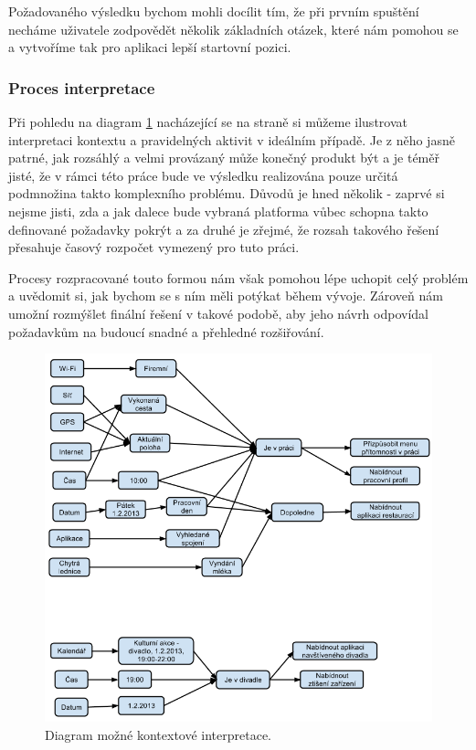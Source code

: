\documentclass[thesis=M,czech]{FITthesis}[2012/06/26]
\begin{document}
Požadovaného výsledku bychom mohli docílit tím, že při prvním spuštění necháme uživatele zodpovědět několik základních otázek, které nám pomohou se  a vytvoříme tak pro aplikaci lepší startovní pozici.

\subsubsection*{Proces interpretace}
Při pohledu na diagram \ref{fig:interpreter} nacházející se na straně \pageref{fig:interpreter} si můžeme ilustrovat interpretaci kontextu a pravidelných aktivit v ideálním případě. Je z něho jasně patrné, jak rozsáhlý a velmi provázaný může konečný produkt být a je téměř jisté, že v rámci této práce bude ve výsledku realizována pouze určitá podmnožina takto komplexního problému. Důvodů je hned několik - zaprvé si nejsme jisti, zda a jak dalece bude vybraná platforma vůbec schopna takto definované požadavky pokrýt a za druhé je zřejmé, že rozsah takového řešení přesahuje časový rozpočet vymezený pro tuto práci.

Procesy rozpracované touto formou nám však pomohou lépe uchopit celý problém a uvědomit si, jak bychom se s ním měli potýkat během vývoje. Zároveň nám umožní rozmýšlet finální řešení v takové podobě, aby jeho návrh odpovídal požadavkům na budoucí snadné a přehledné rozšiřování.

\begin{figure}\centering
	\includegraphics[width=1\textwidth]{figures/interpreter_process}
	\caption{Diagram možné kontextové interpretace.}
	\label{fig:interpreter}
\end{figure}
\end{document}
